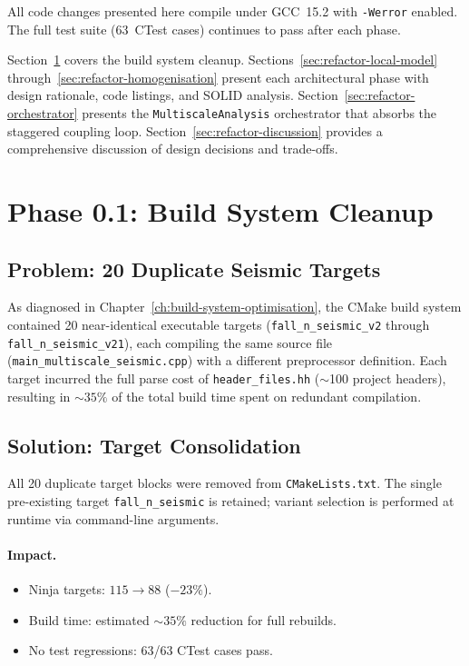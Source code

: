 All code changes presented here compile under GCC~15.2 with
\texttt{-Werror} enabled.  The full test suite (63~CTest cases)
continues to pass after each phase.

Section~\ref{sec:refactor-build-cleanup} covers the build system
cleanup.  Sections~\ref{sec:refactor-local-model}
through~\ref{sec:refactor-homogenisation} present each architectural
phase with design rationale, code listings, and SOLID analysis.
Section~\ref{sec:refactor-orchestrator} presents the
\texttt{MultiscaleAnalysis} orchestrator that absorbs the staggered
coupling loop.  Section~\ref{sec:refactor-discussion} provides a
comprehensive discussion of design decisions and trade-offs.


\section{Phase 0.1: Build System Cleanup}
\label{sec:refactor-build-cleanup}

\subsection{Problem: 20 Duplicate Seismic Targets}

As diagnosed in Chapter~\ref{ch:build-system-optimisation}, the
CMake build system contained 20 near-identical executable targets
(\texttt{fall\_n\_seismic\_v2} through \texttt{fall\_n\_seismic\_v21}),
each compiling the same source file
(\texttt{main\_multiscale\_seismic.cpp}) with a different preprocessor
definition.  Each target incurred the full parse cost of
\texttt{header\_files.hh} ($\sim$100 project headers), resulting in
${\sim}35\%$ of the total build time spent on redundant compilation.

\subsection{Solution: Target Consolidation}

All 20 duplicate target blocks were removed from
\texttt{CMakeLists.txt}.  The single pre-existing target
\texttt{fall\_n\_seismic} is retained; variant selection is
performed at runtime via command-line arguments.

\paragraph{Impact.}
\begin{itemize}
  \item Ninja targets: $115 \to 88$ ($-23\%$).
  \item Build time: estimated ${\sim}35\%$ reduction for full rebuilds.
  \item No test regressions: 63/63 CTest cases pass.
\end{itemize}


